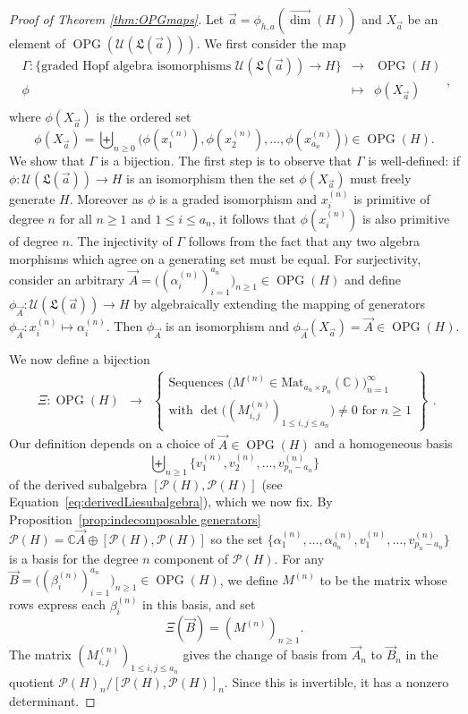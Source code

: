 \documentclass[11pt]{amsart}
\theoremstyle{definition}
\numberwithin{equation}{section}
\def\CC{{\mathbb C}}
\newcommand{\vecdim}{\overrightarrow{\dim}}
\newcommand{\OPG}{\operatorname{OPG}}
\begin{document}
\begin{proof}[Proof of Theorem \ref{thm:OPGmaps}]
Let $\vec{a} = \phi_{h,a}(\vecdim(H))$ and $X_{\vec{a}}$ be an element of $\OPG(\mathcal{U}(\mathfrak{L}(\vec{a})))$.
We first consider the map 
\[
\begin{array}{rcl}
\Gamma: \{\text{graded Hopf algebra isomorphisms $\mathcal{U}(\mathfrak{L}(\vec{a})) \to H$}\} &\to& \OPG(H) \\
\phi & \mapsto & \phi(X_{\vec{a}}) \\
\end{array},
\]
where $\phi(X_{\vec{a}})$ is the  ordered set
\[
\phi(X_{\vec{a}}) = \biguplus_{n \ge 0} \big( \phi(x_{1}^{(n)}), \phi(x_{2}^{(n)}), \ldots, \phi(x_{a_{n}}^{(n)}) \big) \in \OPG(H).
\]
We show that $\Gamma$ is a bijection.  The first step is to observe that $\Gamma$
is well-defined: if $\phi: \mathcal{U}(\mathfrak{L}(\vec{a})) \to H$
is an isomorphism then the set $\phi(X_{\vec{a}})$ must freely generate $H$.
Moreover as $\phi$ is a graded isomorphism and $x_{i}^{(n)}$ is primitive
of degree $n$ for all $n \ge 1$ and $1 \le i \le a_{n}$, it follows that
$\phi(x_{i}^{(n)})$ is also primitive of degree $n$.
The injectivity of $\Gamma$ follows from the fact that any two algebra
morphisms which agree on a generating set must be equal.
For surjectivity, consider an arbitrary
$\vec{A} = \big((\alpha_{i}^{(n)})_{i=1}^{a_{n}}\big)_{n \ge 1} \in \OPG(H)$
and define $\phi_{\vec{A}}:\mathcal{U}(\mathfrak{L}(\vec{a})) \to H$ by
algebraically extending the mapping of generators $\phi_{\vec{A}}: x_{i}^{(n)} \mapsto \alpha_i^{(n)}$.
Then $\phi_{\vec{A}}$ is an isomorphism and $\phi_{\vec{A}}(X_{\vec{a}}) = \vec{A} \in \OPG(H)$.

We now define a bijection
\[
\begin{array}{rcl}
\Xi: \OPG(H) &\to& \left\{ \begin{array}{c}
\text{Sequences $\big(M^{(n)} \in \mathrm{Mat}_{a_{n} \times p_{n}}(\CC)\big)_{n=1}^{\infty}$ } \\
\text{with $\det\big( (M^{(n)}_{i, j})_{1 \le i, j \le a_{n}} \big) \neq 0$ for $n \ge 1$}
\end{array}\right\}
\end{array}.
\]
Our definition depends on a choice of $\vec{A} \in \OPG(H)$ and a homogeneous basis 
\[
\biguplus_{n \geq 1}\{v_1^{(n)},v_2^{(n)},\ldots,v_{p_n - a_n}^{(n)}\}
\]
of the derived subalgebra $[\mathcal{P}(H),\mathcal{P}(H)]$  (see Equation~\eqref{eq:derivedLiesubalgebra}), which we now fix.  
By Proposition~\ref{prop:indecomposable generators} $\mathcal{P}(H) = \CC \vec{A} \oplus [\mathcal{P}(H), \mathcal{P}(H)]$ so the set $\{\alpha_{1}^{(n)}, \ldots, \alpha_{a_{n}}^{(n)}, v_{1}^{(n)}, \ldots, v_{p_n - a_n}^{(n)}\}$ is a basis for the degree $n$ component of $\mathcal{P}(H)$.  
For any $\vec{B} = \big((\beta_{i}^{(n)})_{i=1}^{a_{n}}\big)_{n \ge 1} \in \OPG(H)$, we define $M^{(n)}$ to be the matrix whose rows express each $\beta_{i}^{(n)}$ in this basis, and set
\[
\Xi(\vec{B}) = (M^{(n)})_{n \ge 1}.
\]
The matrix $(M^{(n)}_{i, j})_{1 \le i, j \le a_{n}}$ gives the change of basis from $\vec{A}_{n}$ to $\vec{B}_{n}$ in the quotient $\mathcal{P}(H)_{n}/[\mathcal{P}(H),\mathcal{P}(H)]_{n}$.  Since this is invertible, it has a nonzero determinant.


\end{proof}
\end{document}
